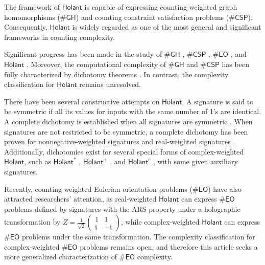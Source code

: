 \documentclass[a4paper,UKenglish,cleveref, autoref, thm-restate]{lipics-v2021}
\newcommand{\hol}[0]{\textsf{Holant}}
\newcommand{\eo}[0]{\textsf{EO}}
\newcommand{\csp}[0]{\textsf{CSP}}
\begin{document}
The framework of $\hol$ is capable of expressing counting weighted graph homomorphisms (\#$\textsf{GH}$) and counting constraint satisfaction problems ($\#\csp$). Consequently, $\hol$ is widely regarded as one of the most general and significant frameworks in counting complexity.

Significant progress has been made in the study of \#$\textsf{GH}$ \cite{lovasz1967operations,hell1990complexity,dyer2000complexity,bulatov2005complexity,dyer2007counting,goldberg2010complexity,cai2013graph,cai2019decidable}, $\#\csp$ \cite{bulatov2005complexity,bulatov2007towards,dyer2009complexity,bulatov2009complexity,cai2009holant,dyer2010complexity,guo2011complexity,bulatov2012complexity,bulatov2013complexity,dyer2013effective,cai2014complexity,cai2016nonnegative,cai2017godel}, $\#\eo$ \cite{cai2018complexity,cai2020beyond,shao2024eulerian}, and $\hol$ \cite{cai2009holant,cai2011computational,cai2011holant*,cai2013vanishing,backens2017holant+,cai2018realholantc,backens2021full,lin2018holantnonnegative,cai2020holantoddarity,shao2020realholant}. Moreover, the computational complexity of \#$\textsf{GH}$ and $\#\csp$ has been fully characterized by dichotomy theorems \cite{cai2013graph,cai2014complexity}. In contrast, the complexity classification for $\hol$ remains unresolved.

 There have been several constructive attempts on $\hol$. A signature is said to be symmetric if all its values for inputs with the same number of 1's are identical. A complete dichotomy is established when all signatures are symmetric \cite{cai2013vanishing}. When signatures are not restricted to be symmetric, a complete dichotomy has been proven for nonnegative-weighted signatures \cite{lin2018holantnonnegative} and real-weighted signatures \cite{shao2020realholant}. Additionally, dichotomies exist for several special forms of complex-weighted $\hol$, such as $\hol^*$ \cite{cai2011holant*}, $\hol^+$ \cite{backens2017holant+}, and $\hol^c$ \cite{backens2021full}, with some given auxiliary signatures.

Recently, counting weighted Eulerian orientation problems ($\#\eo$) have also attracted researchers' attention, as real-weighted $\hol$ can express $\#\eo$ problems defined by signatures with the ARS property \cite{cai2020beyond} under a holographic transformation by $Z=\frac{1}{\sqrt{2}}\left(\begin{matrix}
1 &  1\\
\mathfrak{i} & -\mathfrak{i} 
\end{matrix}\right)$, while complex-weighted $\hol$ can express $\#\eo$ problems under the same transformation. The complexity classification for complex-weighted $\#\eo$ problems remains open, and therefore this article seeks a more generalized characterization of $\#\eo$ complexity.
\end{document}

